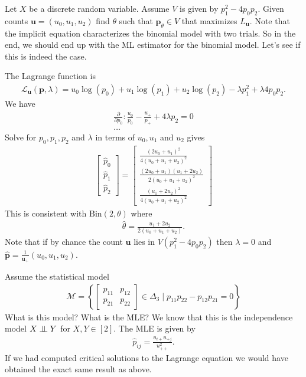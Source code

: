 \begin{eg}
  Let \( X \) be a discrete random variable. Assume \( V \) is given by \( p_1^2 - 4p_0p_2 \). Given counts \( \mathbf u = (u_0, u_1, u_2) \) find \( \theta \) such that \(\mathbf p_\theta \in V \) that maximizes \( L_\mathbf u \). Note that the implicit equation characterizes the binomial model with two trials. So in the end, we should end up with the ML estimator for the binomial model. Let's see if this is indeed the case.
  
  The Lagrange function is
  \begin{align*}
    \mathcal{L}_\mathbf u (\mathbf p, \lambda) = u_0 \log(p_0) + u_1 \log(p_1) + u_2 \log(p_2) - \lambda p_1^2 +  \lambda 4p_0p_2.
  \end{align*}
  We have 
  \begin{align*}
    \frac{\partial}{\partial p_0}: \frac{u_0}{p_0} - \frac{u_+}{p_+} + 4\lambda p_2 = 0 \\
    \dots
  \end{align*}
  Solve for \( p_0,p_1,p_2 \) and \( \lambda \) in terms of \( u_0, u_1 \) and \( u_2 \) gives 
  \begin{align*}
    \begin{bmatrix}
      \hat p_0 \\ \hat p_1 \\ \hat p_2
    \end{bmatrix} =
    \begin{bmatrix}
      \frac{(2u_0 + u_1)^2}{4(u_0 + u_1 + u_2)^2} \\
      \frac{(2u_0 + u_1)(u_1 + 2u_2)}{2(u_0 +  u_1 + u_2)^2} \\
      \frac{(u_1 + 2u_2)^2}{4(u_0 + u_1 + u_2)^2}
    \end{bmatrix}
  \end{align*}
  This is consistent with \( \mathrm{Bin}(2, \theta) \) where 
  \begin{align*}
    \hat \theta = \frac{u_1 + 2u_2}{2(u_0 + u_1 + u_2)}.
  \end{align*}
  Note that if by chance the count \( \mathbf u \) lies in \( V(p_1^2 - 4p_0p_2) \) then \( \lambda = 0 \) and \( \hat{\mathbf p} = \frac{1}{\mathbf u_+}(u_0,u_1,u_2)\).
\end{eg}

\begin{eg}
  Assume the statistical model 
  \begin{align*}
    \mathcal{M} = \left\{ \begin{bmatrix} p_{11} & p_{12} \\ p_{21} & p_{22} \end{bmatrix} \in \Delta_3 \mid p_{11}p_{22} - p_{12}p_{21} = 0 \right\} 
  \end{align*}
  What is this model? What is the MLE? We know that this is the independence model \( X \perp \!\!\! \perp Y \) for \( X,Y \in [2] \). The MLE is given by 
  \begin{align*}
    \hat p_{ij} = \frac{u_{i+}u_{+j}}{u_{++}^2}.
  \end{align*}
  If we had computed critical solutions to the Lagrange equation we would have obtained the exact same result as above.
\end{eg}

